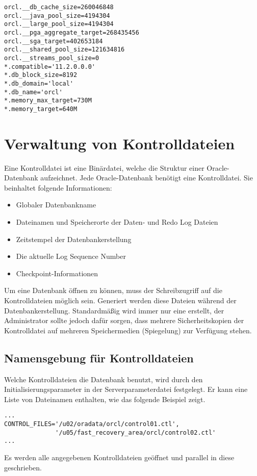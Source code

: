 \clearpage
        \begin{lstlisting}[caption={Auszug aus einer Parameterdatei},label=admin24,language=terminal]
orcl.__db_cache_size=260046848
orcl.__java_pool_size=4194304
orcl.__large_pool_size=4194304
orcl.__pga_aggregate_target=268435456
orcl.__sga_target=402653184
orcl.__shared_pool_size=121634816
orcl.__streams_pool_size=0
*.compatible='11.2.0.0.0'
*.db_block_size=8192
*.db_domain='local'
*.db_name='orcl'
*.memory_max_target=730M
*.memory_target=640M
        \end{lstlisting}
    \section{Verwaltung von Kontrolldateien}
      Eine Kontrolldatei ist eine Bin\"ardatei, welche die Struktur einer Oracle-Datenbank aufzeichnet. Jede Oracle-Datenbank ben\"otigt eine Kontrolldatei. Sie beinhaltet folgende Informationen:
      \begin{itemize}
        \item Globaler Datenbankname
        \item Dateinamen und Speicherorte der Daten- und Redo Log Dateien
        \item Zeitstempel der Datenbankerstellung
        \item Die aktuelle Log Sequence Number
        \item Checkpoint-Informationen
      \end{itemize}
      Um eine Datenbank \"offnen zu k\"onnen, muss der Schreibzugriff auf die Kontrolldateien m\"oglich sein. Generiert werden diese Dateien w\"ahrend der Datenbankerstellung. Standardm\"a\ss ig wird immer nur eine erstellt, der Administrator sollte jedoch daf\"ur sorgen, dass mehrere Sicherheitskopien der Kontrolldatei auf mehreren Speichermedien (Spiegelung) zur Verf\"ugung stehen.
      \subsection{Namensgebung f\"ur Kontrolldateien}
        Welche Kontrolldateien die Datenbank benutzt, wird durch den Initialisierungsparameter  in der Serverparameterdatei festgelegt. Er kann eine Liste von Dateinamen enthalten, wie das folgende Beispiel zeigt.
\clearpage
				\begin{lstlisting}[caption={Der Parameter \parameter{control\_files}},label=admin25,language=terminal]
...
CONTROL_FILES='/u02/oradata/orcl/control01.ctl',
              '/u05/fast_recovery_area/orcl/control02.ctl'
...
        \end{lstlisting}
        \begin{merke}
          Es werden alle angegebenen Kontrolldateien ge\"offnet und parallel in diese geschrieben.
        \end{merke}
